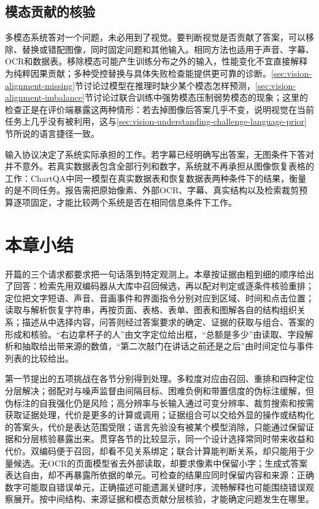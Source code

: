 \subsection{模态贡献的核验}
\label{sec:vision-understanding-input-protocol}

多模态系统答对一个问题，未必用到了视觉。要判断视觉是否贡献了答案，可以移除、替换或错配图像，同时固定问题和其他输入。相同方法也适用于声音、字幕、OCR和数据表。移除模态可能产生训练分布之外的输入，性能变化不宜直接解释为纯粹因果贡献；多种受控替换与具体失败检查能提供更可靠的诊断。\ref{sec:vision-alignment-missing}节讨论过模型在推理时缺少某个模态怎样预测，\ref{sec:vision-alignment-imbalance}节讨论过联合训练中强势模态压制弱势模态的现象；这里的检查正是在评价端暴露这两种情形：若去掉图像后答案几乎不变，说明视觉在当前任务上几乎没有被利用，这与\ref{sec:vision-understanding-challenge-language-prior}节所说的语言捷径一致。

输入协议决定了系统实际承担的工作。若字幕已经明确写出答案，无图条件下答对并不意外。若真实数据表包含全部行列和数字，系统就不再承担从图像恢复表格的工作：ChartQA中同一模型在真实数据表和恢复数据表两种条件下的结果，衡量的是不同任务。报告需把原始像素、外部OCR、字幕、真实结构以及检索裁剪预算逐项固定，才能比较两个系统是否在相同信息条件下工作。

\section{本章小结}
\label{sec:vision-understanding-summary}

开篇的三个请求都要求把一句话落到特定观测上。本章按证据由粗到细的顺序给出了回答：检索先用双编码器从大库中召回候选，再以配对判定或逐条件核验重排；定位把文字短语、声音、音画事件和界面指令分别对应到区域、时间和点击位置；读取与解析恢复字符串，再按页面、表格、表单、图表和图解各自的结构组织关系；描述从中选择内容，问答则经过答案要求的确定、证据的获取与组合、答案的形成和核验。“右边拿杯子的人”由文字定位给出框，“总额是多少”由读取、字段解析和抽取给出带来源的数值，“第二次敲门在讲话之前还是之后”由时间定位与事件列表的比较给出。

第一节提出的五项挑战在各节分别得到处理。多粒度对应由召回、重排和四种定位分层解决；弱配对与噪声监督由间隔目标、困难负例和带置信度的伪标注缓解，但伪标注的自我强化仍是风险；高分辨率与长输入通过可变分辨率、裁剪搜索和按需获取证据处理，代价是更多的计算或调用；证据组合可以交给外显的操作或结构化的答案头，代价是表达范围受限；语言先验没有被某个模型消除，只能通过保留证据和分层核验暴露出来。贯穿各节的比较显示，同一个设计选择常同时带来收益和代价。双编码便于召回，却看不见关系绑定；联合计算能判断关系，却只能用于少量候选。无OCR的页面模型省去外部读取，却要求像素中保留小字；生成式答案表达自由，却不再暴露所依据的单元。可检查的结果应同时保留内容和来源：正确数字可能取自错误单元，正确描述可能遗漏关键时序，流畅解释也可能围绕错误观察展开。按中间结构、来源证据和模态贡献分层核验，才能确定问题发生在哪里。

